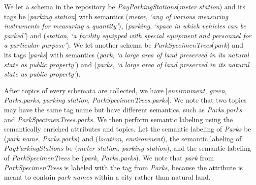 We let a schema in the repository be \textit{PayParkingStations}(\textit{meter station}) and its tags be [\textit{parking station}] with semantics (\textit{meter}, \textit{`any of various measuring instruments for measuring a quantity'}), (\textit{parking}, \textit{`space in which vehicles can be parked'}) and (\textit{station}, \textit{`a facility equipped with special equipment and personnel for a particular purpose'}). We let another schema be \textit{ParkSpecimenTrees}(\textit{park}) and its tags [\textit{parks}] with semantics (\textit{park}, \textit{`a large area of land preserved in its natural state as public property'}) and (\textit{parks}, \textit{`a large area of land preserved in its natural state as public property'}).

After topics of every schemata are collected, we have [\textit{environment}, \textit{green}, \textit{Parks.parks}, \textit{parking station}, \textit{ParkSpecimenTrees.parks}]. We note that two topics may have the same tag name but have different semantics, such as \textit{Parks.parks} and \textit{ParkSpecimenTrees.parks}. We then perform semantic labeling using the semantically enriched attributes and topics. Let the semantic labeling of \textit{Parks} be (\textit{park name}, \textit{Parks.parks}) and (\textit{location}, \textit{environment}), the semantic labeling of \textit{PayParkingStations} be (\textit{meter station}, \textit{parking station}), and the semantic labeling of \textit{ParkSpecimenTrees} be (\textit{park}, \textit{Parks.parks}). We note that \textit{park} from \textit{ParkSpecimenTrees} is labeled with the tag from \textit{Parks}, because the attribute is meant to contain \textit{park names} within a city rather than natural land.

